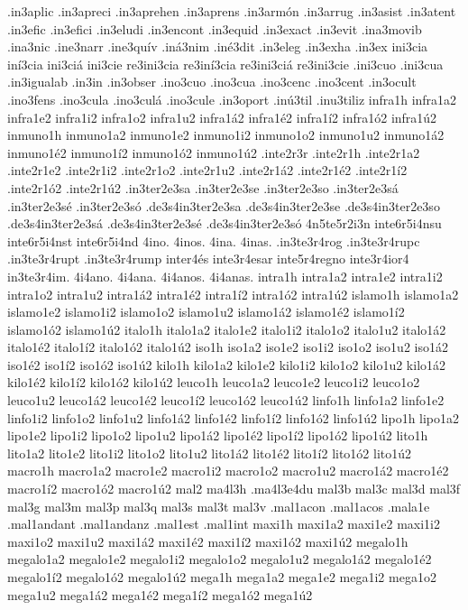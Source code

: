 {.in3aplic
.in3apreci
.in3aprehen
.in3aprens
.in3armón
.in3arrug
.in3asist
.in3atent
.in3efic
.in3efici
.in3eludi
.in3encont
.in3equid
.in3exact
.in3evit
.ina3movib
.ina3nic
.ine3narr
.ine3quív
.iná3nim
.iné3dit
.in3eleg
.in3exha
.in3ex
ini3cia
iní3cia
ini3ciá
ini3cie
re3ini3cia
re3iní3cia
re3ini3ciá
re3ini3cie
.ini3cuo
.ini3cua
.in3igualab
.in3in
.in3obser
.ino3cuo
.ino3cua
.ino3cenc
.ino3cent
.in3ocult
.ino3fens
.ino3cula
.ino3culá
.ino3cule
.in3oport
.inú3til
.inu3tiliz
infra1h
infra1a2 infra1e2 infra1i2 infra1o2 infra1u2
infra1á2 infra1é2 infra1í2 infra1ó2 infra1ú2
inmuno1h
inmuno1a2 inmuno1e2 inmuno1i2 inmuno1o2 inmuno1u2
inmuno1á2 inmuno1é2 inmuno1í2 inmuno1ó2 inmuno1ú2
.inte2r3r
.inte2r1h
.inte2r1a2 .inte2r1e2 .inte2r1i2 .inte2r1o2 .inte2r1u2
.inte2r1á2 .inte2r1é2 .inte2r1í2 .inte2r1ó2 .inte2r1ú2
.in3ter2e3sa
.in3ter2e3se
.in3ter2e3so
.in3ter2e3sá
.in3ter2e3sé
.in3ter2e3só
.de3s4in3ter2e3sa
.de3s4in3ter2e3se
.de3s4in3ter2e3so
.de3s4in3ter2e3sá
.de3s4in3ter2e3sé
.de3s4in3ter2e3só
4n5te5r2i3n
inte6r5i4nsu
inte6r5i4nst
inte6r5i4nd
4ino.
4inos.
4ina.
4inas.
.in3te3r4rog
.in3te3r4rupc
.in3te3r4rupt
.in3te3r4rump
inter4és
inte3r4esar
inte5r4regno
inte3r4ior4
in3te3r4im.
4i4ano.
4i4ana.
4i4anos.
4i4anas.
intra1h
intra1a2 intra1e2 intra1i2 intra1o2 intra1u2
intra1á2 intra1é2 intra1í2 intra1ó2 intra1ú2
islamo1h
islamo1a2 islamo1e2 islamo1i2 islamo1o2 islamo1u2
islamo1á2 islamo1é2 islamo1í2 islamo1ó2 islamo1ú2
italo1h
italo1a2 italo1e2 italo1i2 italo1o2 italo1u2
italo1á2 italo1é2 italo1í2 italo1ó2 italo1ú2
iso1h
iso1a2 iso1e2 iso1i2 iso1o2 iso1u2
iso1á2 iso1é2 iso1í2 iso1ó2 iso1ú2
kilo1h
kilo1a2 kilo1e2 kilo1i2 kilo1o2 kilo1u2
kilo1á2 kilo1é2 kilo1í2 kilo1ó2 kilo1ú2
leuco1h
leuco1a2 leuco1e2 leuco1i2 leuco1o2 leuco1u2
leuco1á2 leuco1é2 leuco1í2 leuco1ó2 leuco1ú2
linfo1h
linfo1a2 linfo1e2 linfo1i2 linfo1o2 linfo1u2
linfo1á2 linfo1é2 linfo1í2 linfo1ó2 linfo1ú2
lipo1h
lipo1a2 lipo1e2 lipo1i2 lipo1o2 lipo1u2
lipo1á2 lipo1é2 lipo1í2 lipo1ó2 lipo1ú2
lito1h
lito1a2 lito1e2 lito1i2 lito1o2 lito1u2
lito1á2 lito1é2 lito1í2 lito1ó2 lito1ú2
macro1h
macro1a2 macro1e2 macro1i2 macro1o2 macro1u2
macro1á2 macro1é2 macro1í2 macro1ó2 macro1ú2
mal2
ma4l3h
.ma4l3e4du
mal3b
mal3c
mal3d
mal3f
mal3g
mal3m
mal3p
mal3q
mal3s
mal3t
mal3v
.mal1acon
.mal1acos
.mala1e
.mal1andant
.mal1andanz
.mal1est
.mal1int
maxi1h
maxi1a2 maxi1e2 maxi1i2 maxi1o2 maxi1u2
maxi1á2 maxi1é2 maxi1í2 maxi1ó2 maxi1ú2
megalo1h
megalo1a2 megalo1e2 megalo1i2 megalo1o2 megalo1u2
megalo1á2 megalo1é2 megalo1í2 megalo1ó2 megalo1ú2
mega1h
mega1a2 mega1e2 mega1i2 mega1o2 mega1u2
mega1á2 mega1é2 mega1í2 mega1ó2 mega1ú2
}
